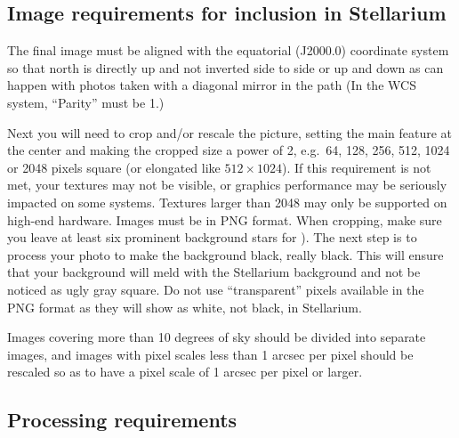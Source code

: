 \subsection{Image requirements for inclusion in Stellarium}
\label{sec:dso:adding_images:image-requirements}

The final image must be aligned with the equatorial (J2000.0)
coordinate system so that north is directly up and not inverted side
to side or up and down as can happen with photos taken with a diagonal
mirror in the path (In the WCS system, ``Parity'' must be 1.)

Next you will need to crop and/or rescale the picture, setting the
main feature at the center and making the cropped size a power of 2,
e.g.\ 64, 128, 256, 512, 1024 or 2048 pixels square (or elongated like
$512\times1024$). If this requirement is not met, your textures may
not be visible, or graphics performance may be seriously impacted on
some systems. Textures larger than 2048 may only be supported on
high-end hardware. Images must be in PNG format. When cropping, make
sure you leave at least six prominent background stars for
). The next step is to process your photo to
make the background black, really black. This will ensure that your
background will meld with the Stellarium background and not be noticed
as ugly gray square. Do not use ``transparent'' pixels available in
the PNG format as they will show as white, not black, in Stellarium.

Images covering more than 10 degrees of sky should be divided into
separate images, and images with pixel scales less than 1 arcsec per
pixel should be rescaled so as to have a pixel scale of 1 arcsec per
pixel or larger.

\subsection{Processing requirements}
\label{sec:dso:adding_images:processing-requirements}

